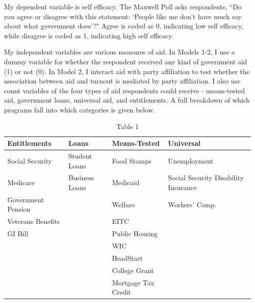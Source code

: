 \documentclass[12pt]{paper}
\begin{document}
My dependent variable is self efficacy. The Maxwell Poll asks respondents, ``Do you agree or disagree with this statement: `People like me don’t have much say about what government does'?" Agree is coded as 0, indicating low self efficacy, while disagree is coded as 1, indicating high self efficacy.

My independent variables are various measures of aid. In Models 1-2, I use a dummy variable for whether the respondent received any kind of government aid (1) or not (0). In Model 2, I interact aid with party affiliation to test whether the association between aid and turnout is mediated by party affiliation. I also use count variables of the four types of aid respondents could receive - means-tested aid, government loans, universal aid, and entitlements. A full breakdown of which programs fall into which categories is given below.

\begin{table}[]
	\caption{Table 1} 
	\label{}
	\begin{adjustbox}{width=1\textwidth}
\begin{tabular}{llll}
	\hline
	\textbf{Entitlements} & \textbf{Loans} & \textbf{Means-Tested} & \textbf{Universal}                   \\ \hline
	Social Security       & Student Loans  & Food Stamps           & Unemployment                         \\
	Medicare              & Business Loans & Medicaid              & Social Security Disability Insurance \\
	Government Pension    &                & Welfare               & Workers' Comp.                       \\
	Veterans Benefits     &                & EITC                  &                                      \\
	GI Bill               &                & Public Housing        &                                      \\
	&                & WIC                   &                                      \\
	&                & HeadStart             &                                      \\
	&                & College Grant         &                                      \\
	&                & Mortgage Tax Credit   &                                      \\ \hline
\end{tabular}
\end{adjustbox}
\end{table}
\end{document}
